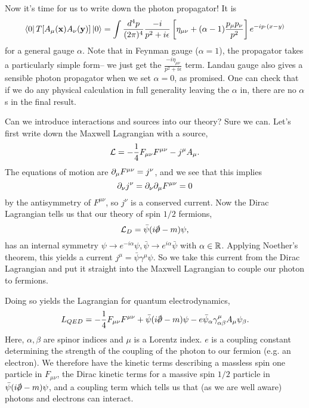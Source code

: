 Now it's time for us to write down the photon propagator! It is
$$\left< 0 \right|T[A_\mu(\boldsymbol{\mathbf{x}})A_\nu (\boldsymbol{\mathbf{y}})]\left| 0 \right>= \int \frac{d^4p}{(2\pi)^4} \frac{-i}{p^2+i\epsilon} \left[\eta_{\mu\nu}+(\alpha-1)\frac{p_\mu p_\nu}{p^2}\right]e^{-ip\cdot (x-y)}$$
for a general gauge $\alpha$. Note that in Feynman gauge ($\alpha=1$), the propagator takes a particularly simple form-- we just get the $\frac{-i \eta_{\mu\nu}}{p^2+i\epsilon}$ term. Landau gauge also gives a sensible photon propagator when we set $\alpha=0$, as promised. One can check that if we do any physical calculation in full generality leaving the $\alpha$ in, there are no $\alpha$s in the final result.

Can we introduce interactions and sources into our theory? Sure we can. Let's first write down the Maxwell Lagrangian with a source,
$$\mathcal L=-\frac{1}{4}F_{\mu\nu}F^{\mu\nu}-j^\mu A_\mu.$$
The equations of motion are $\partial_\mu F^{\mu\nu}=j^\nu$, and we see that this implies
$$\partial_\nu j^\nu =\partial_\nu \partial_\mu F^{\mu\nu}=0$$
by the antisymmetry of $F^{\mu\nu}$, so $j^\nu$ is a conserved current. Now the Dirac Lagrangian tells us that our theory of spin $1/2$ fermions,
$$\cL_D=\bar \psi(i\slashed{\p}-m)\psi,$$
has an internal symmetry $\psi\to e^{-i\alpha}\psi, \bar \psi \to e^{i\alpha}\bar \psi$ with $\alpha\in \mathbb{R}$. Applying Noether's theorem, this yields a current $j^\mu=\bar \psi \gamma^\mu \psi$. So we take this current from the Dirac Lagrangian and put it straight into the Maxwell Lagrangian to couple our photon to fermions.

Doing so yields the Lagrangian for quantum electrodynamics,
$$L_{QED}=-\frac{1}{4}F_{\mu\nu}F^{\mu\nu}+\bar \psi(i\slashed{\p}-m)\psi - e\bar \psi_\alpha \gamma^\mu_{\alpha\beta} A_\mu \psi_\beta.$$
Here, $\alpha,\beta$ are spinor indices and $\mu$ is a Lorentz index. $e$ is a coupling constant determining the strength of the coupling of the photon to our fermion (e.g. an electron). We therefore have the kinetic terms describing a massless spin one particle in $F_{\mu\nu}$, the Dirac kinetic terms for a massive spin $1/2$ particle in $\bar \psi(i\slashed{\p}-m)\psi$, and a coupling term which tells us that (as we are well aware) photons and electrons can interact.
